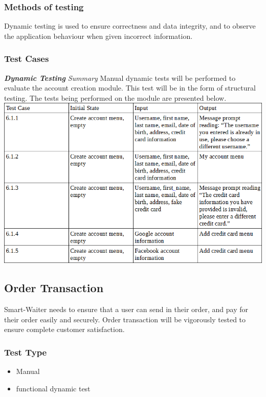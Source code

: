 \documentclass[12pt]{article}
\begin{document}
\subsubsection{Methods of testing}
Dynamic testing is used to ensure correctness and data integrity, and to observe the application behaviour when given incorrect information.
\subsubsection{Test Cases}
\textbf{\textit{Dynamic Testing}}\newline
\newline
\textit{Summary}\newline
Manual dynamic tests will be performed to evaluate the account creation module. This test will be in the form of structural testing. The tests being performed on the module are presented below. 
\newline
\includegraphics[width=\textwidth,height=\textheight,keepaspectratio]{accountTC.png}


\subsection{Order Transaction}
Smart-Waiter needs to ensure that a user can send in their order, and pay for their order easily and securely. Order transaction will be vigorously tested to ensure complete customer satisfaction.  
\subsubsection{Test Type}
\begin{itemize}
  \item Manual 
  \item functional dynamic test 
 \end{itemize} 
\end{document}
